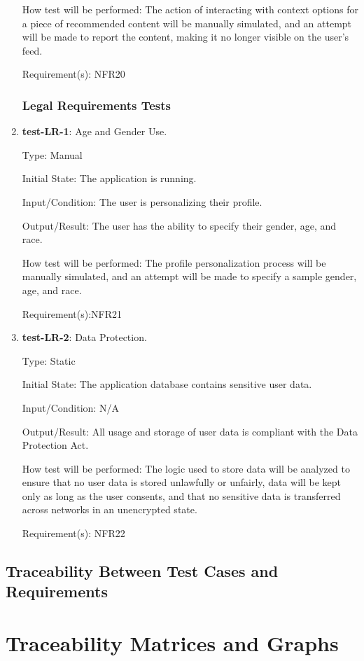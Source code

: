 \documentclass[12pt, titlepage]{article}
\begin{document}
\begin{enumerate}
		How test will be performed: The action of interacting with context options for a piece of recommended content will be manually simulated, and an attempt will be made to report the content, making it no longer visible on the user's feed.
		
		Requirement(s): NFR20
		
	\subsubsection{Legal Requirements Tests}
		\item{\textbf{test-LR-1}}: Age and Gender Use.
		
		Type: Manual
		
		Initial State: The application is running.
		
		Input/Condition: The user is personalizing their profile.
		
		Output/Result: The user has the ability to specify their gender, age, and race.
		
		How test will be performed: The profile personalization process will be manually simulated, and an attempt will be made to specify a sample gender, age, and race.
		
		Requirement(s):NFR21
		\item{\textbf{test-LR-2}}: Data Protection.
		
		Type: Static
		
		Initial State: The application database contains sensitive user data.
		
		Input/Condition: N/A
		
		Output/Result: All usage and storage of user data is compliant with the Data Protection Act.
		
		How test will be performed: The logic used to store data will be analyzed to ensure that no user data is stored unlawfully or unfairly, data will be kept only as long as the user consents, and that no sensitive data is transferred across networks in an unencrypted state.
		
		Requirement(s): NFR22
	\end{enumerate}
	\subsection{Traceability Between Test Cases and Requirements}
	
	\newpage
		\section{Traceability Matrices and Graphs}
	
\end{document}
